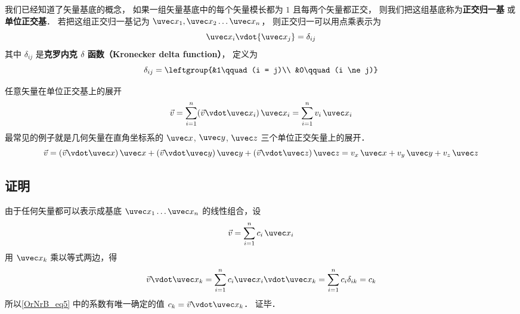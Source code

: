 

我们已经知道了矢量基底的概念， 如果一组矢量基底中的每个矢量模长都为 $1$ 且每两个矢量都正交， 则我们把这组基底称为\textbf{正交归一基} 或\textbf{单位正交基}． 若把这组正交归一基记为 $\uvec x_1,\uvec x_2\dots\uvec x_n$， 则正交归一可以用点乘表示为
\begin{equation}
{\uvec x_i}\vdot{\uvec x_j} = {\delta _{ij}}
\end{equation}
其中 $\delta_{ij}$ 是\textbf{克罗内克 $\delta$ 函数（Kronecker delta function）}， 定义为
\begin{equation}\label{OrNrB_eq2}
\delta_{ij} = \leftgroup{&1\qquad (i = j)\\ &0\qquad (i \ne j)}
\end{equation}

任意矢量在单位正交基上的展开
 \begin{equation}
\vec v = \sum\limits_{i = 1}^n (\vec v\vdot\uvec x_i)\,\uvec x_i = \sum\limits_{i = 1}^n v_i \,\uvec x_i
\end{equation}
最常见的例子就是几何矢量在直角坐标系的 $\uvec x$, $\uvec y$, $\uvec z$ 三个单位正交矢量上的展开．
 \begin{equation}
\vec v = (\vec v \vdot \uvec x)\,\uvec x + (\vec v \vdot \uvec y)\,\uvec y + (\vec v \vdot \uvec z)\,\uvec z = v_x \,\uvec x + v_y \,\uvec y + v_z \,\uvec z
\end{equation} 

\subsection{证明}
由于任何矢量都可以表示成基底 ${\uvec x_1}\dots{\uvec x_n}$ 的线性组合，设
\begin{equation}\label{OrNrB_eq5}
\vec v = \sum\limits_{i = 1}^n {{c_i}{{\,\uvec x}_i}} 
\end{equation} 
用 ${\uvec x_k}$ 乘以等式两边，得
\begin{equation}
\vec v{\vdot\uvec x_k} = \sum\limits_{i = 1}^n {{c_i}{{\uvec x}_i}{{\vdot\uvec x}_k}}  = \sum\limits_{i = 1}^n {{c_i}{\delta _{ik}}}  = {c_k}
\end{equation}
所以\autoref{OrNrB_eq5} 中的系数有唯一确定的值 ${c_k} = \vec v{\vdot\uvec x_k}$． 证毕．






